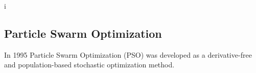 i\subsection{Particle Swarm Optimization}

In 1995 Particle Swarm Optimization (PSO) was developed as a derivative-free and population-based stochastic optimization method.  
